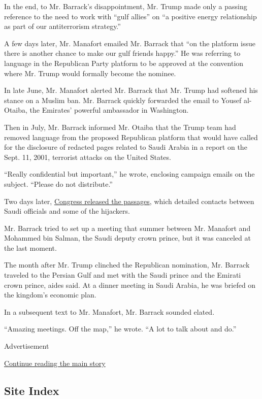 In the end, to Mr. Barrack's disappointment, Mr. Trump made only a
passing reference to the need to work with ``gulf allies'' on ``a
positive energy relationship as part of our antiterrorism strategy.''

A few days later, Mr. Manafort emailed Mr. Barrack that ``on the
platform issue there is another chance to make our gulf friends happy.''
He was referring to language in the Republican Party platform to be
approved at the convention where Mr. Trump would formally become the
nominee.

In late June, Mr. Manafort alerted Mr. Barrack that Mr. Trump had
softened his stance on a Muslim ban. Mr. Barrack quickly forwarded the
email to Yousef al-Otaiba, the Emirates' powerful ambassador in
Washington.

Then in July, Mr. Barrack informed Mr. Otaiba that the Trump team had
removed language from the proposed Republican platform that would have
called for the disclosure of redacted pages related to Saudi Arabia in a
report on the Sept. 11, 2001, terrorist attacks on the United States.

``Really confidential but important,'' he wrote, enclosing campaign
emails on the subject. ``Please do not distribute.''

Two days later,
\href{https://www.nytimes.com/2016/07/16/us/28-pages-saudi-arabia-september-11.html}{Congress
released the passages}, which detailed contacts between Saudi officials
and some of the hijackers.

Mr. Barrack tried to set up a meeting that summer between Mr. Manafort
and Mohammed bin Salman, the Saudi deputy crown prince, but it was
canceled at the last moment.

The month after Mr. Trump clinched the Republican nomination, Mr.
Barrack traveled to the Persian Gulf and met with the Saudi prince and
the Emirati crown prince, aides said. At a dinner meeting in Saudi
Arabia, he was briefed on the kingdom's economic plan.

In a subsequent text to Mr. Manafort, Mr. Barrack sounded elated.

``Amazing meetings. Off the map,'' he wrote. ``A lot to talk about and
do.''

Advertisement

\protect\hyperlink{after-bottom}{Continue reading the main story}

\hypertarget{site-index}{%
\subsection{Site Index}\label{site-index}}

